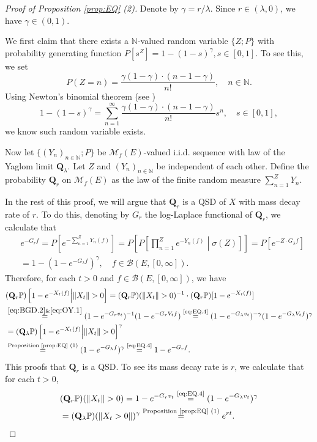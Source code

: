 \documentclass[12pt,a4paper]{amsart}
\numberwithin{equation}{section}
\theoremstyle{plain}
\theoremstyle{definition}
\theoremstyle{remark}
\begin{document}
\begin{proof}[Proof of Proposition \ref{prop:EQ} (2)]
	Denote by $\gamma = r / \lambda$. 
	Since $r \in (\lambda, 0)$, we have $\gamma \in (0,1)$.
	
	We first claim that there exists a $\mathbb N$-valued random variable $\{Z;P\}$ with probability generating function $P[s^Z] = 1 - (1- s)^{\gamma}, s\in [0,1]$. To see this, we set
	\[
	P(Z = n) = \frac{\gamma(1-\gamma ) \cdot (n-1-\gamma  )}{n!}, \quad n \in \mathbb N.
	\]
	Using Newton's binomial theorem (see \cite[Exercise 8.22]{Rudin1976Principles})
	\[
	1 - (1 - s)^\gamma = \sum_{n = 1}^\infty \frac{\gamma (1-\gamma)\cdot (n-1-\gamma )}{n!} s^n, \quad s\in [0,1],
	\] 
	we know such random variable exists.
	
	Now let $\{(Y_n)_{n \in \mathbb N}; P\}$ be $\mathcal M_f(E)$-valued i.i.d. sequence with law of the Yaglom limit $\mathbf Q_\lambda$. 
	Let $Z$ and $(Y_n)_{n\in \mathbb N}$ be independent of each other.  
	Define the probability $\mathbf Q_r$ on $\mathcal M_f(E)$ as the law of the finite random measure $\sum_{n=1}^Z Y_n$.
	
	In the rest of this proof, we will argue that $\mathbf Q_r$ is a QSD of $X$ with mass decay rate of $r$.
	To do this, denoting by $G_r$ the log-Laplace functional of $\mathbf Q_r$, we calculate that
	\begin{align}  
	&e^{- G_r f} 
	= P[ e^{-\sum_{n=1}^Z Y_n(f)} ] 	
	= P\left[P\left[ \prod_{n=1}^Z e^{-Y_n(f)} \middle | \sigma(Z)\right]\right]
	= P \left[ e^{-Z \cdot G_\lambda f}\right] 
	\\&= 1 - (1 - e^{-G_\lambda f})^\gamma, \quad f\in \mathcal B(E,[0,\infty]).  \label{eq:EQ.4}
	\end{align}
	Therefore, for each $t> 0$ and $f\in \mathcal B(E,[0,\infty])$, we have
	\begin{align}
	&(\mathbf Q_r \mathbb P)\left[ 1 - e^{-X_t (f)} \middle|\|X_t\|>0 \right] 
	= (\mathbf Q_r \mathbb P)(\|X_t\| >0)^{-1} \cdot (\mathbf Q_r \mathbb P) [1 - e^{- X_t(f)}]
	\\&\overset{\eqref{eq:BGD.2} \& \eqref{eq:OY.1}}= (1 - e^{-G_r v_t})^{-1}  (1 - e^{-G_r V_tf})
	\overset{\text{\eqref{eq:EQ.4}}}= (1 - e^{- G_\lambda v_t})^{-\gamma}(1 - e^{-G_\lambda V_tf})^{\gamma}
	\\&= (\mathbf Q_\lambda \mathbb P)\left[1 - e^{- X_t(f)}\middle| \|X_t\|>0\right]^{\gamma}
	\\& \overset{\text{Proposition \ref{prop:EQ} (1)}}= (1 - e^{- G_\lambda f})^{\gamma}
	\overset{\text{\eqref{eq:EQ.4}}}= 1 - e^{- G_r f}.
	\end{align} 
	This proofs that $\mathbf Q_r$ is a QSD. 
	To see its mass decay rate is $r$, we calculate that for each $t>0$, \begin{align}
	&(\mathbf Q_r \mathbb P)(\|X_t\|>0) = 1 - e^{- G_r v_t} \overset{\text{\eqref{eq:EQ.4}}}= (1 - e^{- G_\lambda v_t})^\gamma 
	\\&= (\mathbf Q_\lambda \mathbb P) (\|X_t > 0\|)^\gamma \overset{\text{Proposition \ref{prop:EQ} (1)}}= e^{ r t}. \qedhere\end{align} 
\end{proof}
\end{document}
